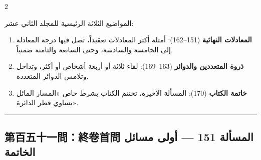 \documentclass[11pt,a4paper]{article}
\newcommand{\ar}[1]{\arabicfont\beginR #1\endR}
\newcommand{\longline}{\noindent\rule{\textwidth}{0.4pt}}
\newcommand{\arnote}[1]{\textcolor{arabicblue}{\ar{#1}}}
\begin{document}
\begin{paracol}{2}
\begin{rightcolumn}
\arnote{المواضيع الثلاثة الرئيسية للمجلد الثاني عشر:}

\begin{enumerate}[leftmargin=1.5em,topsep=0pt]
  \item \arnote{\textbf{المعادلات النهائية} (151--162): أمثلة أكثر المعادلات تعقيداً، تصل فيها درجة المعادلة إلى الخامسة والسادسة، وحتى السابعة والثامنة ضمنياً.}
  \item \arnote{\textbf{ذروة المتعددين والدوائر} (163--169): لقاء ثلاثة أو أربعة أشخاص أو أكثر، وتداخل وتلامس الدوائر المتعددة.}
  \item \arnote{\textbf{خاتمة الكتاب} (170): المسألة الأخيرة، تختتم الكتاب بشرط خاص «المسار المائل يساوي قطر الدائرة».}
\end{enumerate}
\end{rightcolumn}

\end{paracol}

\vspace{0.3cm}
\longline

\subsection*{第百五十一問：終卷首問 \hfill \ar{المسألة 151 — أولى مسائل الخاتمة}}
\end{document}
